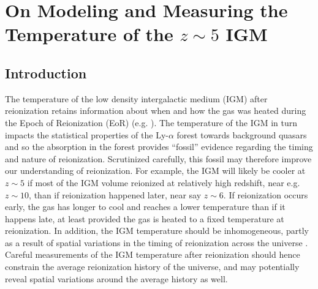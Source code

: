 

\ifpdf
    \graphicspath{{igm_temperature/figures/PNG/}{bubble_finding/figures/PDF/}{bubble_finding/figures/}}
\else
    \graphicspath{{igm_temperature/figures/EPS/}{example_chapter/figures/}}
\fi

\chapter{On Modeling and Measuring the Temperature of the $z \sim 5$ IGM}\label{sec:IGMTemp}

\section{Introduction} \label{sec:IGMTempintro}

The temperature of the low density intergalactic medium (IGM) after reionization retains information about
when and how the gas was heated during the Epoch of Reionization (EoR) (e.g. \citealt{1994MNRAS.266..343M,Hui:1997dp,Theuns:2002yc,Hui:2003hn}).
The temperature of the IGM in turn
impacts the statistical properties of the Ly-$\alpha$ forest towards background quasars and so the absorption in the
forest provides ``fossil'' evidence regarding the timing and nature of reionization. Scrutinized carefully, this
fossil may therefore improve our understanding of reionization. For example, the IGM will likely be cooler at $z \sim 5$ if most of the IGM volume
reionized at relatively high redshift, near e.g. $z \sim 10$, than if reionization happened later, near say $z \sim 6$. If reionization occurs
early, the gas has longer to cool and reaches a lower temperature than if it happens late, at least provided the gas is heated to a fixed
temperature at reionization. In addition, the IGM temperature should be inhomogeneous, partly as a result of spatial
variations in the timing of reionization across the universe \citep{Trac:2008yz,Cen:2009bg,Furlanetto:2009kr}. Careful measurements of the IGM temperature after reionization should hence
constrain the average reionization history of the universe, and may potentially reveal spatial variations around the average 
history as well.

